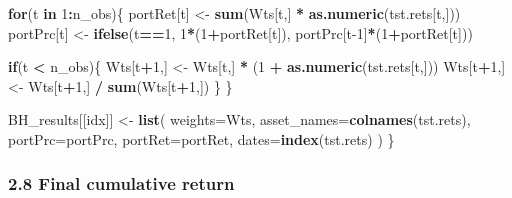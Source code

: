 \documentclass[
  12pt,
]{article}
\newenvironment{Shaded}{\begin{snugshade}}{\end{snugshade}}
\newcommand{\AttributeTok}[1]{\textcolor[rgb]{0.13,0.29,0.53}{#1}}
\newcommand{\ControlFlowTok}[1]{\textcolor[rgb]{0.13,0.29,0.53}{\textbf{#1}}}
\newcommand{\DecValTok}[1]{\textcolor[rgb]{0.00,0.00,0.81}{#1}}
\newcommand{\FunctionTok}[1]{\textcolor[rgb]{0.13,0.29,0.53}{\textbf{#1}}}
\newcommand{\NormalTok}[1]{#1}
\newcommand{\OtherTok}[1]{\textcolor[rgb]{0.56,0.35,0.01}{#1}}
\newcommand{\SpecialCharTok}[1]{\textcolor[rgb]{0.81,0.36,0.00}{\textbf{#1}}}
\begin{document}
\begin{Shaded}
\begin{Highlighting}[]
  \ControlFlowTok{for}\NormalTok{(t }\ControlFlowTok{in} \DecValTok{1}\SpecialCharTok{:}\NormalTok{n\_obs)\{}
\NormalTok{    portRet[t] }\OtherTok{\textless{}{-}} \FunctionTok{sum}\NormalTok{(Wts[t,] }\SpecialCharTok{*} \FunctionTok{as.numeric}\NormalTok{(tst.rets[t,]))}
\NormalTok{    portPrc[t] }\OtherTok{\textless{}{-}} \FunctionTok{ifelse}\NormalTok{(t}\SpecialCharTok{==}\DecValTok{1}\NormalTok{, }\DecValTok{1}\SpecialCharTok{*}\NormalTok{(}\DecValTok{1}\SpecialCharTok{+}\NormalTok{portRet[t]), portPrc[t}\DecValTok{{-}1}\NormalTok{]}\SpecialCharTok{*}\NormalTok{(}\DecValTok{1}\SpecialCharTok{+}\NormalTok{portRet[t]))}
    
    \ControlFlowTok{if}\NormalTok{(t }\SpecialCharTok{\textless{}}\NormalTok{ n\_obs)\{}
\NormalTok{      Wts[t}\SpecialCharTok{+}\DecValTok{1}\NormalTok{,] }\OtherTok{\textless{}{-}}\NormalTok{ Wts[t,] }\SpecialCharTok{*}\NormalTok{ (}\DecValTok{1} \SpecialCharTok{+} \FunctionTok{as.numeric}\NormalTok{(tst.rets[t,]))}
\NormalTok{      Wts[t}\SpecialCharTok{+}\DecValTok{1}\NormalTok{,] }\OtherTok{\textless{}{-}}\NormalTok{ Wts[t}\SpecialCharTok{+}\DecValTok{1}\NormalTok{,] }\SpecialCharTok{/} \FunctionTok{sum}\NormalTok{(Wts[t}\SpecialCharTok{+}\DecValTok{1}\NormalTok{,])}
\NormalTok{    \}}
\NormalTok{  \}}
  
\NormalTok{  BH\_results[[idx]] }\OtherTok{\textless{}{-}} \FunctionTok{list}\NormalTok{(}
    \AttributeTok{weights=}\NormalTok{Wts,}
    \AttributeTok{asset\_names=}\FunctionTok{colnames}\NormalTok{(tst.rets),}
    \AttributeTok{portPrc=}\NormalTok{portPrc,}
    \AttributeTok{portRet=}\NormalTok{portRet,}
    \AttributeTok{dates=}\FunctionTok{index}\NormalTok{(tst.rets)}
\NormalTok{  )}
\NormalTok{\}}
\end{Highlighting}
\end{Shaded}

\subsubsection{2.8 Final cumulative
return}\label{final-cumulative-return-1}
\end{document}

